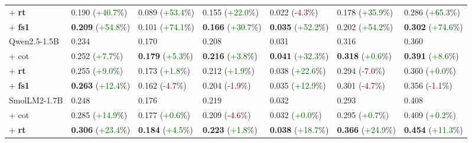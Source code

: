 \documentclass[11pt]{article}
\begin{document}
\begin{table}[t]
\begin{tabular}{lllllll}
\hspace{1em} + {\textbf{rt}} & 0.190 (\textcolor{darkgreen}{+40.7}\%) & 0.089 (\textcolor{darkgreen}{+53.4}\%) & 0.155 (\textcolor{darkgreen}{+22.0}\%) & 0.022 (\textcolor{darkred}{-4.3}\%) & 0.178 (\textcolor{darkgreen}{+35.9}\%) & 0.286 (\textcolor{darkgreen}{+65.3}\%) \\
\hspace{1em} + {\textbf{fs1}} & \textbf{0.209} (\textcolor{darkgreen}{+54.8}\%) & 0.101 (\textcolor{darkgreen}{+74.1}\%) & \textbf{0.166} (\textcolor{darkgreen}{+30.7}\%) & \textbf{0.035} (\textcolor{darkgreen}{+52.2}\%) & 0.202 (\textcolor{darkgreen}{+54.2}\%) & \textbf{0.302} (\textcolor{darkgreen}{+74.6}\%) \\
\midrule
Qwen2.5-1.5B & 0.234 & 0.170 & 0.208 & 0.031 & 0.316 & 0.360 \\
\hspace{1em} + {cot} & 0.252 (\textcolor{darkgreen}{+7.7}\%) & \textbf{0.179} (\textcolor{darkgreen}{+5.3}\%) & \textbf{0.216} (\textcolor{darkgreen}{+3.8}\%) & \textbf{0.041} (\textcolor{darkgreen}{+32.3}\%) & \textbf{0.318} (\textcolor{darkgreen}{+0.6}\%) & \textbf{0.391} (\textcolor{darkgreen}{+8.6}\%) \\
\hspace{1em} + {\textbf{rt}} & 0.255 (\textcolor{darkgreen}{+9.0}\%) & 0.173 (\textcolor{darkgreen}{+1.8}\%) & 0.212 (\textcolor{darkgreen}{+1.9}\%) & 0.038 (\textcolor{darkgreen}{+22.6}\%) & 0.294 (\textcolor{darkred}{-7.0}\%) & 0.360 (\textcolor{darkgreen}{+0.0}\%) \\
\hspace{1em} + {\textbf{fs1}} & \textbf{0.263} (\textcolor{darkgreen}{+12.4}\%) & 0.162 (\textcolor{darkred}{-4.7}\%) & 0.204 (\textcolor{darkred}{-1.9}\%) & 0.035 (\textcolor{darkgreen}{+12.9}\%) & 0.301 (\textcolor{darkred}{-4.7}\%) & 0.356 (\textcolor{darkred}{-1.1}\%) \\
\midrule
SmolLM2-1.7B & 0.248 & 0.176 & 0.219 & 0.032 & 0.293 & 0.408 \\
\hspace{1em} + {cot} & 0.285 (\textcolor{darkgreen}{+14.9}\%) & 0.177 (\textcolor{darkgreen}{+0.6}\%) & 0.209 (\textcolor{darkred}{-4.6}\%) & 0.032 (\textcolor{darkgreen}{+0.0}\%) & 0.295 (\textcolor{darkgreen}{+0.7}\%) & 0.409 (\textcolor{darkgreen}{+0.2}\%) \\
\hspace{1em} + {\textbf{rt}} & \textbf{0.306} (\textcolor{darkgreen}{+23.4}\%) & \textbf{0.184} (\textcolor{darkgreen}{+4.5}\%) & \textbf{0.223} (\textcolor{darkgreen}{+1.8}\%) & \textbf{0.038} (\textcolor{darkgreen}{+18.7}\%) & \textbf{0.366} (\textcolor{darkgreen}{+24.9}\%) & \textbf{0.454} (\textcolor{darkgreen}{+11.3}\%) \\

\end{tabular}
\end{table}
\end{document}

